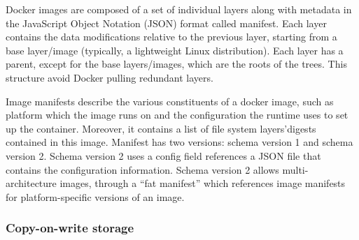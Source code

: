 Docker images are composed of a set of individual layers along with metadata in the JavaScript Object Notation (JSON) format called manifest. Each layer contains the data modifications relative to the previous layer, starting from a base layer/image (typically, a lightweight Linux distribution). Each layer has a parent, except for the base layers/images, which are the roots of the trees. This structure avoid Docker pulling redundant layers. 

Image manifests describe the various constituents of a docker image, such as platform which the image runs on and the configuration the runtime uses to set up the container. Moreover, it contains a list of file system layers'digests contained in this image. Manifest has two versions: schema version 1 and schema version 2. Schema version 2 uses a config field references a JSON file that contains the configuration information. Schema version 2 allows multi-architecture images, through a “fat manifest” which references image manifests for platform-specific versions of an image. 








\subsubsection{Copy-on-write storage}

